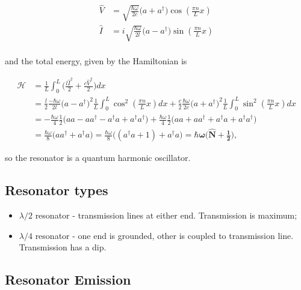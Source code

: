    \begin{align}
     \hat{V} & = \sqrt{\frac{\hbar\omega}{2c}}\bigg(a+a^\dagger\bigg)\cos(\frac{\pi n}{L}x)\\
     \hat{I} & = i\sqrt{\frac{\hbar\omega}{2l}}\bigg(a-a^\dagger\bigg)\sin(\frac{\pi n}{L}x)\\
   \end{align}

   \noindent and the total energy, given by the Hamiltonian is

   \begin{equation}\label{tlineTOtalGamil}
     \begin{aligned}
       \mathcal{H} & = \frac{1}{L}\int_{0}^{L}\bigg(\frac{l\hat{I}^2}{2}+\frac{c\hat{V}^2}{2}\bigg)dx \\
       & = \frac{l}{2}\frac{-\hbar\omega}{2l}\bigg(a-a^{\dagger}\bigg)^2\frac{1}{L}\int_{0}^{L}\cos^2(\frac{\pi n}{L}x)dx + \frac{c}{2}\frac{\hbar\omega}{2c}\bigg(a+a^{\dagger}\bigg)^2\frac{1}{L}\int_{0}^{L}\sin^2(\frac{\pi n}{L}x)dx\\
       & = -\frac{\hbar\omega}{4}\frac{1}{2}\bigg(aa-aa^{\dagger}-a^{\dagger}a+a^{\dagger}a^{\dagger}\bigg)+\frac{\hbar\omega}{4}\frac{1}{2}\bigg(aa+aa^{\dagger}+a^{\dagger}a+a^{\dagger}a^{\dagger}\bigg)\\
       &       =       \frac{\hbar\omega}{8}\bigg(aa^{\dagger}+a^{\dagger}a\bigg)=
       \frac{\hbar\omega}{8}\bigg((a^{\dagger}a+1)+a^{\dagger}a\bigg)=\mathbf{\hbar\omega\bigg(\hat{N}+\frac{1}{2}\bigg)},
     \end{aligned}
   \end{equation}

   \noindent so the resonator is a quantum harmonic oscillator.

   \subsection{Resonator types}
   \label{sec:resonator-types}

   \begin{itemize}
   \item  $\lambda/2$   resonator  -  transmission  lines   at  either
     end. Transmission is maximum;
   \item $\lambda/4$ resonator - one end is grounded, other is coupled
     to transmission line. Transmission has a dip.
   \end{itemize}

   \subsection{Resonator Emission}
   \label{sec:resonator-emission}

